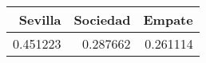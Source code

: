 \begin{tabular}{rrr}
\hline
   Sevilla &   Sociedad &   Empate \\
\hline
  0.451223 &   0.287662 & 0.261114 \\
\hline
\end{tabular}